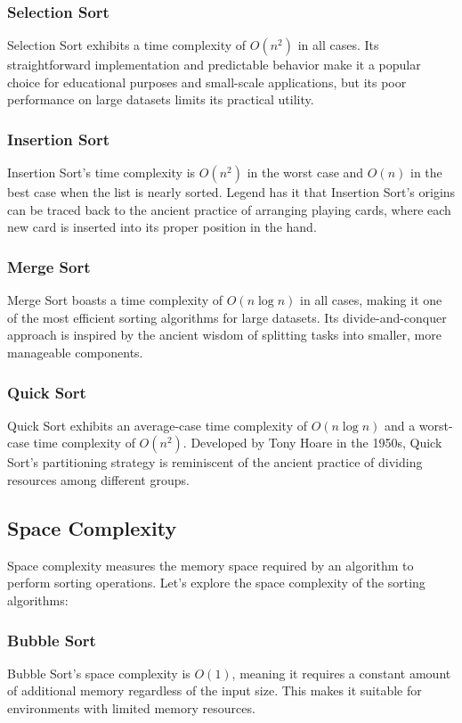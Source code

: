 \documentclass{article}
\begin{document}
\subsubsection{Selection Sort}
Selection Sort exhibits a time complexity of \(O(n^2)\) in all cases. Its straightforward implementation and predictable behavior make it a popular choice for educational purposes and small-scale applications, but its poor performance on large datasets limits its practical utility.

\subsubsection{Insertion Sort}
Insertion Sort's time complexity is \(O(n^2)\) in the worst case and \(O(n)\) in the best case when the list is nearly sorted. Legend has it that Insertion Sort's origins can be traced back to the ancient practice of arranging playing cards, where each new card is inserted into its proper position in the hand.

\subsubsection{Merge Sort}
Merge Sort boasts a time complexity of \(O(n \log n)\) in all cases, making it one of the most efficient sorting algorithms for large datasets. Its divide-and-conquer approach is inspired by the ancient wisdom of splitting tasks into smaller, more manageable components.

\subsubsection{Quick Sort}
Quick Sort exhibits an average-case time complexity of \(O(n \log n)\) and a worst-case time complexity of \(O(n^2)\). Developed by Tony Hoare in the 1950s, Quick Sort's partitioning strategy is reminiscent of the ancient practice of dividing resources among different groups.

\subsection{Space Complexity}
Space complexity measures the memory space required by an algorithm to perform sorting operations. Let's explore the space complexity of the sorting algorithms:

\subsubsection{Bubble Sort}
Bubble Sort's space complexity is \(O(1)\), meaning it requires a constant amount of additional memory regardless of the input size. This makes it suitable for environments with limited memory resources.
\end{document}
